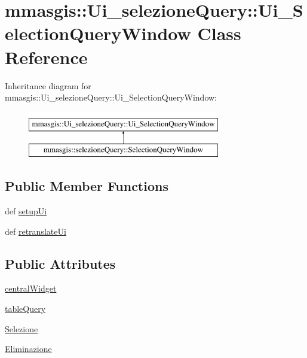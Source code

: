 \hypertarget{classmmasgis_1_1Ui__selezioneQuery_1_1Ui__SelectionQueryWindow}{
\section{mmasgis::Ui\_\-selezioneQuery::Ui\_\-SelectionQueryWindow Class Reference}
\label{classmmasgis_1_1Ui__selezioneQuery_1_1Ui__SelectionQueryWindow}
}
Inheritance diagram for mmasgis::Ui\_\-selezioneQuery::Ui\_\-SelectionQueryWindow:\begin{figure}[H]
\begin{center}
\leavevmode
\includegraphics[height=2.000000cm]{classmmasgis_1_1Ui__selezioneQuery_1_1Ui__SelectionQueryWindow}
\end{center}
\end{figure}
\subsection*{Public Member Functions}
\begin{DoxyCompactItemize}
\item 
def \hyperlink{classmmasgis_1_1Ui__selezioneQuery_1_1Ui__SelectionQueryWindow_a691eed95cd311d6a4be5c55e8fb34198}{setupUi}
\item 
def \hyperlink{classmmasgis_1_1Ui__selezioneQuery_1_1Ui__SelectionQueryWindow_a2b812877097be4773348763e71b24857}{retranslateUi}
\end{DoxyCompactItemize}
\subsection*{Public Attributes}
\begin{DoxyCompactItemize}
\item 
\hyperlink{classmmasgis_1_1Ui__selezioneQuery_1_1Ui__SelectionQueryWindow_a47df625e1edc9d17a77cac3866cf2dbf}{centralWidget}
\item 
\hyperlink{classmmasgis_1_1Ui__selezioneQuery_1_1Ui__SelectionQueryWindow_acfa28b494d90548cdd6e5fc1f23881a1}{tableQuery}
\item 
\hyperlink{classmmasgis_1_1Ui__selezioneQuery_1_1Ui__SelectionQueryWindow_a9f17ffaa47eb33a7652eaa02817be169}{Selezione}
\item 
\hyperlink{classmmasgis_1_1Ui__selezioneQuery_1_1Ui__SelectionQueryWindow_a3719f5dd2252838131a0c05dcbc87b0c}{Eliminazione}
\end{DoxyCompactItemize}


